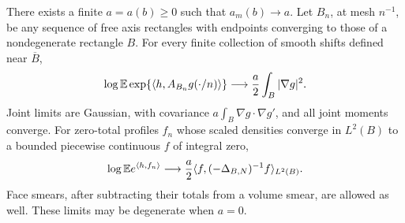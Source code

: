 \begin{theorem}\label{thm:free-limits}
There exists a finite \(a=a(b)\ge0\) such that \(a_m(b)\to a\).
Let \(B_n\), at mesh \(n^{-1}\), be any sequence of free axis
rectangles with endpoints converging to those of a nondegenerate
rectangle \(B\). For every finite collection of smooth shifts
defined near \(\overline B\),
\begin{equation}
 \log\mathbb E\exp\{\langle h,A_{B_n}g(\cdot/n)\rangle\}
 \longrightarrow \frac a2\int_B|\nabla g|^2.
 \label{eq:free-gradient-limit}
\end{equation}
Joint limits are Gaussian, with covariance
\(a\int_B\nabla g\cdot\nabla g'\), and all joint moments converge.
For zero-total profiles \(f_n\) whose scaled densities converge in
\(L^2(B)\) to a bounded piecewise continuous \(f\) of integral zero,
\begin{equation}
 \log\mathbb E e^{\langle h,f_n\rangle}
 \longrightarrow
 \frac a2\langle f,(-\Delta_{B,N})^{-1}f\rangle_{L^2(B)}.
 \label{eq:free-smear-limit}
\end{equation}
Face smears, after subtracting their totals from a volume smear,
are allowed as well. These limits may be degenerate when \(a=0\).
\end{theorem}

